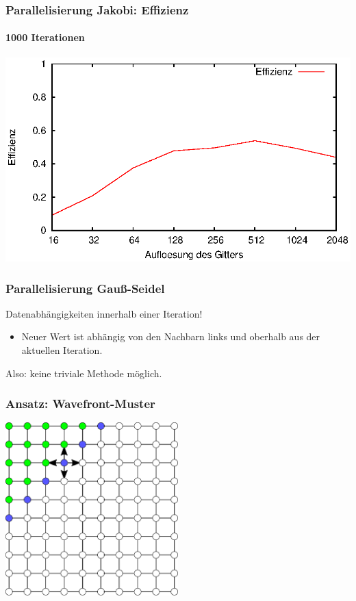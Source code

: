 \documentclass{beamer}
\begin{document}
\begin{frame}
    \frametitle{Parallelisierung Jakobi: Effizienz}
    \framesubtitle{1000 Iterationen}
    \includegraphics[width=\textwidth]{plots/effizienzjakobi}
\end{frame}

\begin{frame}
    \frametitle{Parallelisierung Gauß-Seidel}
    Datenabhängigkeiten innerhalb einer Iteration!
    \begin{itemize}
        \item Neuer Wert ist abhängig von den Nachbarn links und oberhalb aus der aktuellen Iteration.
    \end{itemize}
    Also: keine triviale Methode möglich.
\end{frame}

\begin{frame}
    \frametitle{Ansatz: Wavefront-Muster}
    \begin{center}
        \includegraphics[width=0.5\textwidth]{wavefront-datadependencies}
    \end{center}
\end{frame}
\end{document}
